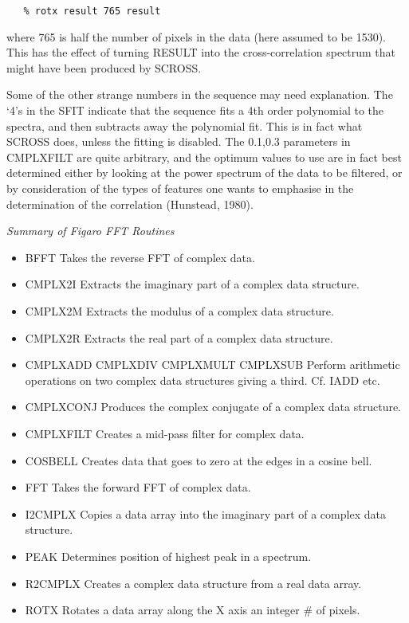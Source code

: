 \begin{verbatim}
   % rotx result 765 result
\end{verbatim}

where 765 is half the number of pixels in the data (here assumed to be
1530).  This has the effect of turning RESULT into the cross-correlation
spectrum that might have been produced by SCROSS.

Some of the other strange numbers in the sequence may need explanation.
The `4's in the SFIT indicate that the sequence fits a 4th order polynomial
to the spectra, and then subtracts away the polynomial fit.  This is in
fact what SCROSS does, unless the fitting is disabled.  The 0.1,0.3
parameters in CMPLXFILT are quite arbitrary, and the optimum values to use
are in fact best determined either by looking at the power spectrum of
the data to be filtered, or by consideration of the types of features one
wants to emphasise in the determination of the correlation (Hunstead,
1980).


\goodbreak
\vspace{12pt}
{\it Summary of Figaro FFT Routines}

\begin{itemize}
\item BFFT Takes the reverse FFT of complex data.
\item CMPLX2I Extracts the imaginary part of a complex data structure.
\item CMPLX2M Extracts the modulus of a complex data structure.
\item CMPLX2R Extracts the real part of a complex data structure.
\item CMPLXADD  CMPLXDIV  CMPLXMULT  CMPLXSUB    Perform arithmetic operations
   on two complex data structures giving a third.  Cf. IADD etc.
\item CMPLXCONJ Produces the complex conjugate of a
   complex data structure.
\item CMPLXFILT Creates a mid-pass filter for complex data.
\item COSBELL Creates data that goes to zero at the edges in a
   cosine bell.
\item FFT Takes the forward FFT of complex data.
\item I2CMPLX Copies a data array into the imaginary part of a complex 
   data structure.
\item PEAK Determines position of highest peak in a spectrum.
\item R2CMPLX Creates a complex data structure from a real data array.
\item ROTX Rotates a data array along the X axis an integer \# of pixels.
\end{itemize}


